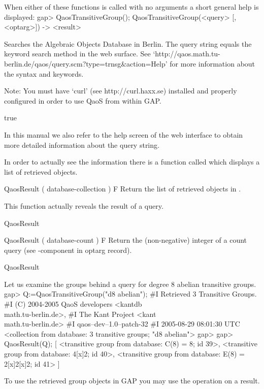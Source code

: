 When either of these functions is called with no arguments a short general help
is displayed:
\beginexample
gap> QaosTransitiveGroup();
QaosTransitiveGroup(<query> [, <optarg>]) -> <result>
 
Searches the Algebraic Objects Database in Berlin.
The query string equals the keyword search method in the web surface.
See
`http://qaos.math.tu-berlin.de/qaos/query.scm?type=trnsg&action=Help'
for more information about the syntax and keywords.
 
Note: You must have `curl' (see http://curl.haxx.se) installed and properly
configured in order to use QaoS from within GAP.
 
true
\endexample

In this manual we also refer to the help screen of the web interface to obtain
more detailed information about the query string.





In order to actually see the information there is a function called
 which displays a list of retrieved objects.

\> QaosResult ( database-collection ) F
Return the list of retrieved objects in .

This function actually reveals the result of a query.

\findex QaosResult

\> QaosResult ( database-count ) F
Return the (non-negative) integer of a count query (see -component
in optarg record). 

\findex QaosResult


Let us examine the groups behind a query for degree 8 abelian transitive groups.
\beginexample
gap> Q:=QaosTransitiveGroup("d8 abelian");
#I Retrieved 3 Transitive Groups.
#I (C) 2004-2005 QaoS developers <kantdb\\math.tu-berlin.de>,
#I The Kant Project <kant\\math.tu-berlin.de>
#I qaos--dev--1.0--patch-32
#I 2005-08-29 08:01:30 UTC
<collection from database: 3 transitive groups; "d8 abelian">
gap>
gap> QaosResult(Q);
[ <transitive group from database: C(8) = 8; id 39>,
  <transitive group from database: 4[x]2; id 40>,
  <transitive group from database: E(8) = 2[x]2[x]2; id 41> ]
\endexample

To use the retrieved group objects in GAP you may use the 
operation on a result.


